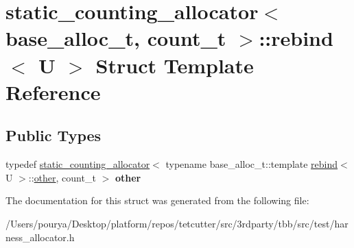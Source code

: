 \hypertarget{structstatic__counting__allocator_1_1rebind}{}\section{static\+\_\+counting\+\_\+allocator$<$ base\+\_\+alloc\+\_\+t, count\+\_\+t $>$\+:\+:rebind$<$ U $>$ Struct Template Reference}
\label{structstatic__counting__allocator_1_1rebind}
\subsection*{Public Types}
\begin{DoxyCompactItemize}
\item 
\hypertarget{structstatic__counting__allocator_1_1rebind_a98135cd760a74230d283978f2f2a6912}{}typedef \hyperlink{classstatic__counting__allocator}{static\+\_\+counting\+\_\+allocator}$<$ typename base\+\_\+alloc\+\_\+t\+::template \hyperlink{structstatic__counting__allocator_1_1rebind}{rebind}$<$ U $>$\+::\hyperlink{classstatic__counting__allocator}{other}, count\+\_\+t $>$ {\bfseries other}\label{structstatic__counting__allocator_1_1rebind_a98135cd760a74230d283978f2f2a6912}

\end{DoxyCompactItemize}


The documentation for this struct was generated from the following file\+:\begin{DoxyCompactItemize}
\item 
/\+Users/pourya/\+Desktop/platform/repos/tetcutter/src/3rdparty/tbb/src/test/harness\+\_\+allocator.\+h\end{DoxyCompactItemize}
